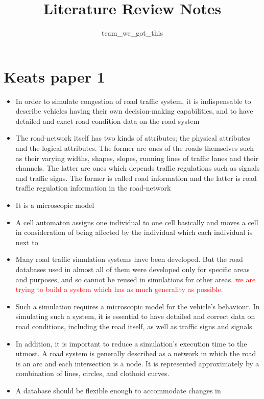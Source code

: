 \documentclass[]{article}
\title{Literature Review Notes}
\author{team\_we\_got\_this}
\begin{document}
\maketitle


\section*{Keats paper 1}
	\begin{itemize}
		\item  In order to simulate congestion of road traffic system, it is indispensable to describe vehicles having their own decision-making capabilities, and to have detailed and exact road condition data on the road system
		\item The road-network itself has two kinds of attributes; the physical attributes and the logical attributes.
		 The former are ones of the roads themselves such as their varying widths, shapes, slopes, running lines of traffic lanes and their channels. 
		 The latter are ones which depends traffic regulations such as signals and traffic signs. 
		 The former is called road information and the latter is road traffic regulation information in the road-network
		 \item It is a microscopic model 
		 \item A cell automaton assigns one individual to one cell basically and moves a cell in consideration of being affected by the individual which each individual is next to
		 \item Many road traffic simulation systems have been developed. But the road databases used in almost all of them were developed only for specific areas and purposes, and so cannot be reused in simulations for other areas. \textcolor{red}{we are trying to build a system which has as much generality as possible.} \cite{namekawa2005general}
		 \item Such a simulation requires a microscopic model for the vehicle's behaviour. In simulating such a system, it is essential to have detailed and correct data on road conditions, including the road itself, as well as  traffic signs and signals.
		 \item In addition, it is
		 important to reduce a simulation’s execution time to the utmost. A road system is generally described as a network in which the road is an arc and each intersection is a node. It is represented approximately by a combination of lines, circles, and clothoid curves.
		 \item A database should
		 be flexible enough to accommodate changes in

\end{itemize}
\end{document}
